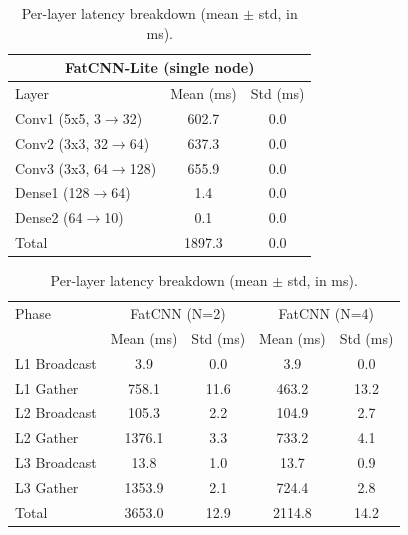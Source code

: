 \begin{table}[htbp]
\centering
\caption{Per-layer latency breakdown (mean $\pm$ std, in ms).}
\label{tab:perlayer}
\begin{tabular}{lcc}
\toprule
\multicolumn{3}{c}{\textbf{FatCNN-Lite (single node)}} \\
\midrule
Layer & Mean (ms) & Std (ms) \\
\midrule
Conv1 (5x5, 3$\to$32) & 602.7 & 0.0 \\
Conv2 (3x3, 32$\to$64) & 637.3 & 0.0 \\
Conv3 (3x3, 64$\to$128) & 655.9 & 0.0 \\
Dense1 (128$\to$64) & 1.4 & 0.0 \\
Dense2 (64$\to$10) & 0.1 & 0.0 \\
\midrule
Total & 1897.3 & 0.0 \\
\bottomrule
\end{tabular}

\vspace{1em}
\begin{tabular}{lcccc}
\toprule
Phase & \multicolumn{2}{c}{FatCNN (N=2)} & \multicolumn{2}{c}{FatCNN (N=4)} \\
 & Mean (ms) & Std (ms) & Mean (ms) & Std (ms) \\
\midrule
L1 Broadcast & 3.9 & 0.0 & 3.9 & 0.0 \\
L1 Gather & 758.1 & 11.6 & 463.2 & 13.2 \\
L2 Broadcast & 105.3 & 2.2 & 104.9 & 2.7 \\
L2 Gather & 1376.1 & 3.3 & 733.2 & 4.1 \\
L3 Broadcast & 13.8 & 1.0 & 13.7 & 0.9 \\
L3 Gather & 1353.9 & 2.1 & 724.4 & 2.8 \\
\midrule
Total & 3653.0 & 12.9 & 2114.8 & 14.2 \\
\bottomrule
\end{tabular}
\end{table}
